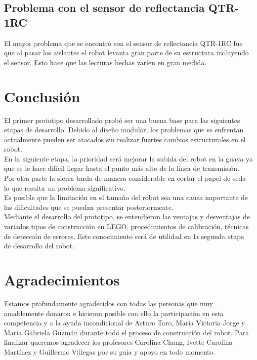 \documentclass[conference]{IEEEtran}
\begin{document}
\bigskip
\subsection{Problema con el sensor de reflectancia QTR-1RC}
\bigskip

El mayor problema que se encontró con el sensor de reflectancia QTR-1RC fue que al pasar los aislantes el robot levanta gran parte de su estructura incluyendo el sensor. Esto hace que las lecturas hechas varíen en gran medida.  

\bigskip
\section{Conclusión}
\bigskip

El primer prototipo desarrollado probó ser una buena base para las siguientes etapas de desarrollo. Debido al diseño modular, los problemas que se enfrentan actualmente pueden ser atacados sin realizar fuertes cambios estructurales en el robot.\\

En la siguiente etapa, la prioridad será mejorar la subida del robot en la guaya ya que se le hace difícil llegar hasta el punto más alto de la línea de transmisión.\\

Por otra parte la sierra tarda de manera considerable en cortar el papel de seda lo que resulta un problema significativo.\\ 

Es posible que la limitación en el tamaño del robot sea una causa importante de las dificultades que se puedan presentar posteriormente.\\

Mediante el desarrollo del prototipo, se entendieron las ventajas y desventajas de variados tipos de construcción en LEGO\textregistered \vspace{2mm}, procedimientos de calibración, técnicas de detección de errores. Este conocimiento será de utilidad en la segunda etapa de desarrollo del robot.\\

\bigskip

\section*{Agradecimientos}
\bigskip

 Estamos profundamente agradecidos con todas las personas que muy amablemente donaron e hicieron posible con ello la participación en esta competencia y a la ayuda incondicional de Arturo Toro, María Victoria Jorge y María Gabriela Guzmán durante todo el proceso de construcción del robot. Para finalizar queremos agradecer los profesores Carolina Chang, Ivette Carolina Martínez y Guillermo Villegas por su guía y apoyo en todo momento. 
\end{document}
